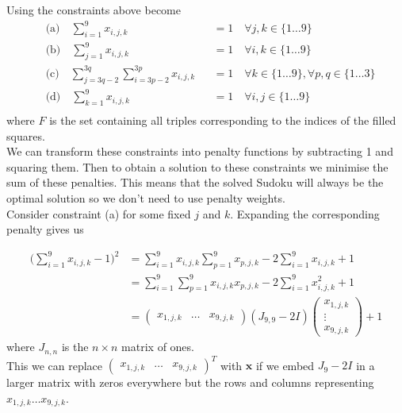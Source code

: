 \documentclass{article}
\begin{document}
\noindent Using \cite[p.~326]{ILPsudoku} the constraints above become
\begin{align*}
&\text{(a)} \quad \sum_{i=1}^9 x_{i,j,k} &&= 1\quad \forall j,k \in \{1 \dots 9\} \\
&\text{(b)} \quad \sum_{j=1}^9 x_{i,j,k} &&= 1\quad \forall i,k \in \{1 \dots 9\} \\
&\text{(c)} \quad \sum_{j=3q-2}^{3q} \sum_{i=3p-2}^{3p} x_{i,j,k} &&= 1\quad \forall k \in \{1 \dots 9\}, \forall p,q \in \{1 \dots 3\}\\
&\text{(d)} \quad \sum_{k=1}^9 x_{i,j,k} &&= 1\quad \forall i,j \in \{1 \dots 9\} \\
\end{align*}
where \(F\) is the set containing all triples corresponding to the indices of the filled squares. \\

\noindent We can transform these constraints into penalty functions by subtracting 1 and squaring them. Then to obtain a solution to these constraints we minimise the sum of these penalties. This means that the solved Sudoku will always be the optimal solution so we don't need to use penalty weights.\\

\noindent Consider constraint (a) for some fixed \(j\) and \(k\). Expanding the corresponding penalty gives us

\begin{align*}
    \bigg(\sum_{i=1}^9 x_{i,j,k} - 1\bigg)^2 &= \sum_{i=1}^9 x_{i,j,k}\sum_{p=1}^9 x_{p,j,k} -2\sum_{i=1}^9 x_{i,j,k} + 1  \\
    &= \sum_{i=1}^9\sum_{p=1}^9 x_{i,j,k}x_{p,j,k} -2\sum_{i=1}^9 x_{i,j,k}^2 + 1 \\
    &= \begin{pmatrix}
        x_{1,j,k} & \dots & x_{9,j,k}
    \end{pmatrix} (J_{9,9} - 2I) \begin{pmatrix}
        x_{1,j,k} \\
        \vdots \\
        x_{9,j,k}
    \end{pmatrix} + 1
\end{align*}
where \(J_{n, n}\) is the \(n \times n\) matrix of ones. \\

\noindent This we can replace \(\begin{pmatrix}
        x_{1,j,k} & \dots & x_{9,j,k}
    \end{pmatrix}^T\) with \(\mathbf{x}\) if we
    embed \(J_9 - 2I\) in a larger matrix with zeros everywhere but the rows and columns representing \(x_{1,j,k} \dots x_{9,j,k}\).\\
\end{document}
